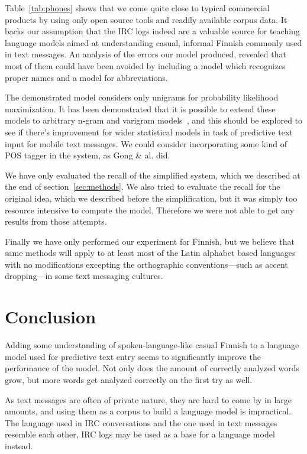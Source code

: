 \documentclass[a4paper,conference]{IEEEtran}
\begin{document}
Table~\ref{tab:phones} shows that we come quite close to typical
commercial products by using only open source tools and readily
available corpus data. It backs our assumption that the IRC logs
indeed are a valuable source for teaching language models aimed at
understanding casual, informal Finnish commonly used in text
messages. An analysis of the errors our model produced, revealed
that most of them could have been avoided by including a model which
recognizes proper names and a model for abbreviations.

The demonstrated model considers only unigrams for probability
likelihood maximization. It has been demonstrated that it is possible
to extend these models to arbitrary n-gram and varigram
models~\cite{Silfverberg/2011}, and this should be explored to see if
there's improvement for wider statistical models in task of predictive
text input for mobile text messages. We could consider incorporating
some kind of POS tagger in the system, as Gong \& al. \cite{gong/2008}
did.

We have only evaluated the recall of the simplified system, which we
described at the end of section~\ref{sec:methods}. We also tried to
evaluate the recall for the original idea, which we described before
the simplification, but it was simply too resource intensive to
compute the model. Therefore we were not able to get any results from
those attempts.

Finally we have only performed our experiment for Finnish, but we
believe that same methods will apply to at least most of the Latin
alphabet based languages with no modifications excepting the
orthographic conventions---such as accent dropping---in some text messaging
cultures.

\section{Conclusion}
\label{sec:conclusions}
Adding some understanding of spoken-language-like casual Finnish to a
language model used for predictive text entry seems to significantly
improve the performance of the model. Not only does the amount of
correctly analyzed words grow, but more words get analyzed correctly
on the first try as well.

As text messages are often of private nature, they are hard to come by
in large amounts, and using them as a corpus to build a language model
is impractical. The language used in IRC conversations and the one
used in text messages resemble each other, IRC logs may be used as a
base for a language model instead.
\end{document}
